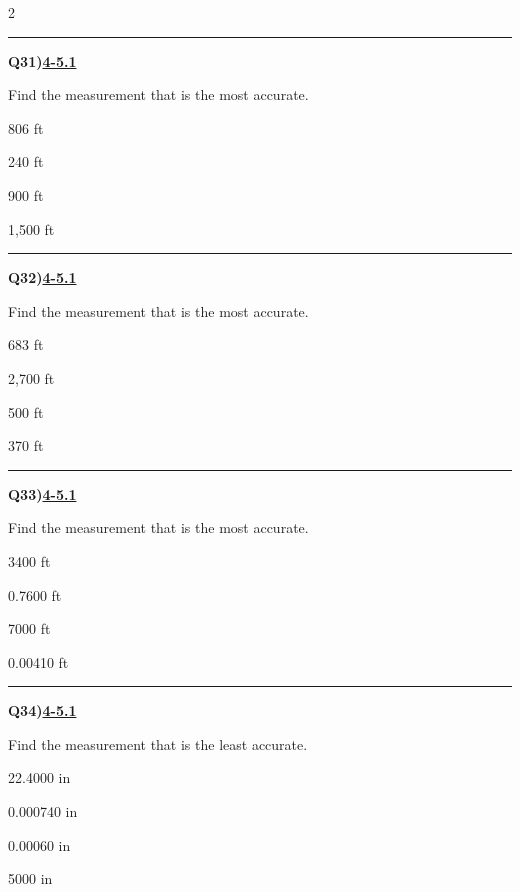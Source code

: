 \documentclass[11pt]{article}
\newenvironment{Qbox}[2]{%
  \par\medskip\noindent\begin{minipage}{\linewidth}%
  \hrule\medskip%
  \textbf{Q#1)}\hfill\textbf{\underline{#2}}\par\smallskip%
}{\par\end{minipage}\par\medskip}
\begin{document}
\begin{multicols}{2}
\begin{Qbox}{31}{4-5.1}
Find the measurement that is the most accurate.
\begin{choices}
  \item 806 ft
  \item 240 ft
  \item 900 ft
  \item 1,500 ft
\end{choices}
\end{Qbox}

\begin{Qbox}{32}{4-5.1}
Find the measurement that is the most accurate.
\begin{choices}
  \item 683 ft
  \item 2,700 ft
  \item 500 ft
  \item 370 ft
\end{choices}
\end{Qbox}

\begin{Qbox}{33}{4-5.1}
Find the measurement that is the most accurate.
\begin{choices}
  \item 3400 ft
  \item 0.7600 ft
  \item 7000 ft
  \item 0.00410 ft
\end{choices}
\end{Qbox}

\begin{Qbox}{34}{4-5.1}
Find the measurement that is the least accurate.
\begin{choices}
  \item 22.4000 in
  \item 0.000740 in
  \item 0.00060 in
  \item 5000 in
\end{choices}
\end{Qbox}


\end{multicols}
\end{document}
